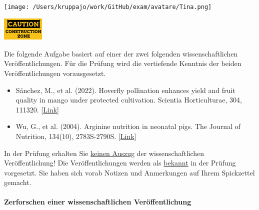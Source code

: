 \documentclass[a4paper, 9pt]{scrartcl}\usepackage[]{graphicx}\usepackage[]{xcolor}
\begin{document}
 
\ifcollection
\begin{flushright}
\tiny\vspace{-3Ex}
\textbf{\examinhaltstart}
\exammodulebiostat
\vspace{-4Ex}
\end{flushright}
\begin{minipage}[t]{0.5\textwidth}
\texttt{[image: /Users/kruppajo/work/GitHub/exam/avatare/Tina.png]}
\end{minipage}
\begin{minipage}[t]{0.5\textwidth}
\hfill
\href{https://youtu.be/C9skfFRTHhI}{\includegraphics[width = 2cm]{img/caution}}
\end{minipage}
\fi



\ifcollection

\begin{graybox}{}
\small
Die folgende Aufgabe basiert auf einer der zwei folgenden wissenschaftlichen Veröffentlichungen. Für die Prüfung wird die vertiefende Kenntnis der beiden Veröffentlichungen vorausgesetzt.

\begin{itemize}[noitemsep]
\item Sánchez, M., et al. (2022). Hoverfly pollination enhances yield and fruit quality in mango under protected cultivation. Scientia Horticulturae, 304, 111320. [\href{https://www.sciencedirect.com/science/article/pii/S0304423822004411}{Link}]
\item Wu, G., et al. (2004). Arginine nutrition in neonatal pigs. The Journal of Nutrition, 134(10), 2783S-2790S. [\href{https://www.sciencedirect.com/science/article/pii/S0022316623031279}{Link}]
\end{itemize}

In der Prüfung erhalten Sie \underline{keinen Auszug} der wissenschaftlichen Veröffentlichung! Die Veröffentlichungen werden als \underline{bekannt} in der Prüfung vorgesetzt. Sie haben sich vorab Notizen und Anmerkungen auf Ihrem Spickzettel gemacht.
\end{graybox}

\paragraph{Zerforschen einer wissenschaftlichen Veröffentlichung}
\fi
\end{document}
